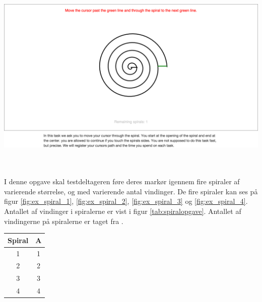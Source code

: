 \begin{minipage}{\textwidth}
\begin{minipage}{.5\textwidth}
		\label{fig:ex_spiral_3}
	\end{minipage}
	\begin{minipage}{.5\textwidth}
		\centering
		\includegraphics[width=\textwidth, trim = 5cm 14cm 5cm 8cm, clip]{images/screenshots/ex_step_5_spiral_4}
		\label{fig:ex_spiral_4}
	\end{minipage}
\end{minipage}\\\\
I denne opgave skal testdeltageren føre deres markør igennem fire spiraler af varierende størrelse, og med varierende antal vindinger. De fire spiraler kan ses på figur \ref{fig:ex_spiral_1}, \ref{fig:ex_spiral_2}, \ref{fig:ex_spiral_3} og \ref{fig:ex_spiral_4}. Antallet af vindinger i spiralerne er vist i figur \ref{tab:spiralopgave}. Antallet af vindingerne på spiralerne er taget fra \cite{accot1997}.
\begin{center}
	\begin{tabular}{c c}
		Spiral & A \\
		\hline
		1 & 1 \\
		2 & 2 \\
		3 & 3 \\
		4 & 4 \\
	\end{tabular}
	\label{tab:spiralopgave}
\end{center}



